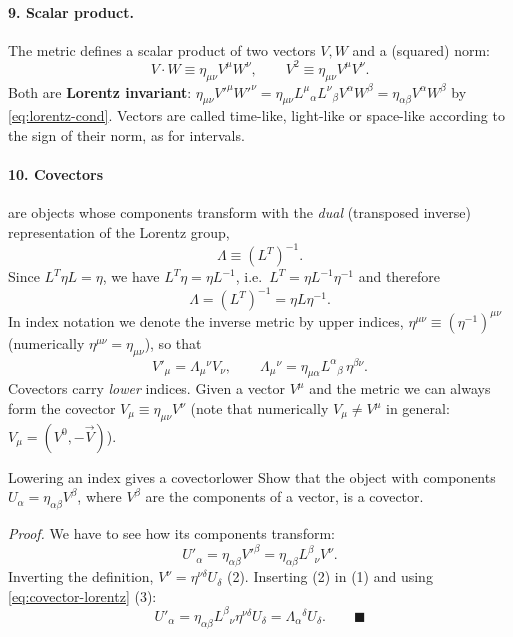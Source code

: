 \paragraph{9. Scalar product.} The metric defines a scalar product of two vectors $V,W$ and a (squared) norm:
\begin{equation}
  V\cdot W\equiv\eta_{\mu\nu}V^\mu W^\nu,\qquad V^2\equiv\eta_{\mu\nu}V^\mu V^\nu .
\end{equation}
Both are \textbf{Lorentz invariant}: $\eta_{\mu\nu}V'^\mu W'^\nu=\eta_{\mu\nu}L^\mu{}_\alpha L^\nu{}_\beta V^\alpha W^\beta=\eta_{\alpha\beta}V^\alpha W^\beta$ by \eqref{eq:lorentz-cond}. Vectors are called time-like, light-like or space-like according to the sign of their norm, as for intervals.

\paragraph{10. Covectors} are objects whose components transform with the \emph{dual} (transposed inverse) representation of the Lorentz group,
\begin{equation}
  \Lambda\equiv(L^T)^{-1}.
\end{equation}
Since $L^T\eta L=\eta$, we have $L^T\eta=\eta L^{-1}$, i.e.\ $L^T=\eta L^{-1}\eta^{-1}$ and therefore
\begin{equation}
  \Lambda=(L^T)^{-1}=\eta L\eta^{-1}.
\end{equation}
In index notation we denote the inverse metric by upper indices, $\eta^{\mu\nu}\equiv(\eta^{-1})^{\mu\nu}$ (numerically $\eta^{\mu\nu}=\eta_{\mu\nu}$), so that
\begin{equation}
  V'_\mu=\Lambda_\mu{}^\nu V_\nu,\qquad \Lambda_\mu{}^\nu=\eta_{\mu\alpha}L^\alpha{}_\beta\,\eta^{\beta\nu}.
  \label{eq:covector-lorentz}
\end{equation}
Covectors carry \emph{lower} indices. Given a vector $V^\mu$ and the metric we can always form the covector $V_\mu\equiv\eta_{\mu\nu}V^\nu$ (note that numerically $V_\mu\neq V^\mu$ in general: $V_\mu=(V^0,-\vec V)$).

\begin{example}{Lowering an index gives a covector}{lower}
Show that the object with components $U_\alpha=\eta_{\alpha\beta}V^\beta$, where $V^\beta$ are the components of a vector, is a covector.

\textit{Proof.} We have to see how its components transform:
\[
  U'_\alpha=\eta_{\alpha\beta}V'^\beta=\eta_{\alpha\beta}L^\beta{}_\nu V^\nu. \tag{1}
\]
Inverting the definition, $V^\nu=\eta^{\nu\delta}U_\delta$ (2). Inserting (2) in (1) and using \eqref{eq:covector-lorentz} (3):
\[
U'_\alpha=\eta_{\alpha\beta}L^\beta{}_\nu\eta^{\nu\delta}U_\delta=\Lambda_\alpha{}^\delta U_\delta . \qquad\blacksquare
\]
\end{example}

